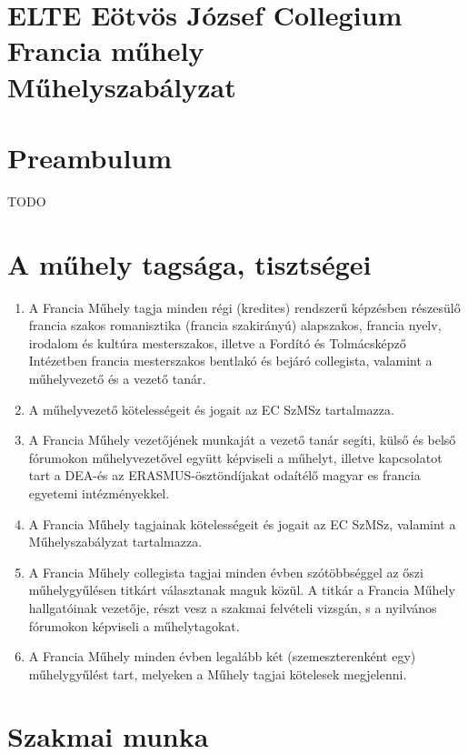 \documentclass{../styles/rulebook}
\begin{document}
\section*{ELTE Eötvös József Collegium \\ Francia műhely\\ \vspace{0.5em} Műhelyszabályzat} 

\vspace{2em}

\section*{Preambulum}
TODO


\section{A műhely tagsága, tisztségei}

\begin{enumerate}
	\item A Francia Műhely tagja minden régi (kredites) rendszerű képzésben részesülő francia szakos romanisztika (francia szakirányú) alapszakos, francia nyelv, irodalom és kultúra mesterszakos, illetve a Fordító és Tolmácsképző Intézetben francia mesterszakos bentlakó és bejáró collegista, valamint a műhelyvezető és a vezető tanár.
	\item A műhelyvezető kötelességeit és jogait az EC SzMSz tartalmazza.
	\item A Francia Műhely vezetőjének munkaját a vezető tanár segíti, külső és belső fórumokon műhelyvezetővel együtt képviseli a műhelyt, illetve kapcsolatot tart a DEA-és az ERASMUS-ösztöndíjakat odaítélő magyar es francia egyetemi intézményekkel.
	\item A Francia Műhely tagjainak kötelességeit és jogait az EC SzMSz, valamint a Műhelyszabályzat tartalmazza.
	\item A Francia Műhely collegista tagjai minden évben szótöbbséggel az őszi műhelygyűlésen titkárt választanak maguk közül. A titkár a Francia Műhely hallgatóinak vezetője, részt vesz a szakmai felvételi vizsgán, s a nyilvános fórumokon képviseli a műhelytagokat.
	\item A Francia Műhely minden évben legalább két (szemeszterenként egy) műhelygyűlést tart, melyeken a Műhely tagjai kötelesek megjelenni.
\end{enumerate}


\section{Szakmai munka}
\end{document}
